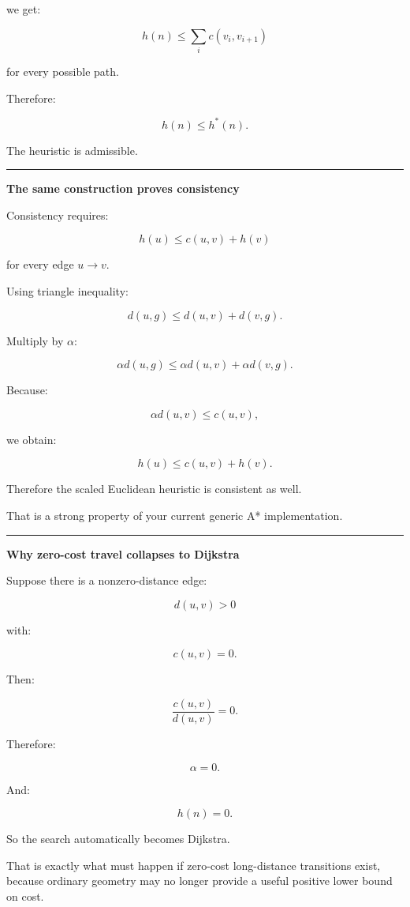 we get:

\[
\boxed{
h(n)
\le
\sum_i c(v_i,v_{i+1})
}
\]

for every possible path.

Therefore:

\[
h(n)\le h^*(n).
\]

The heuristic is admissible.

\begin{center}\rule{0.5\linewidth}{0.5pt}\end{center}

\textbf{The same construction proves consistency}

Consistency requires:

\[
\boxed{
h(u)\le c(u,v)+h(v)
}
\]

for every edge \(u\rightarrow v\).

Using triangle inequality:

\[
d(u,g)
\le
d(u,v)+d(v,g).
\]

Multiply by \(\alpha\):

\[
\alpha d(u,g)
\le
\alpha d(u,v)
+
\alpha d(v,g).
\]

Because:

\[
\alpha d(u,v)
\le
c(u,v),
\]

we obtain:

\[
h(u)
\le
c(u,v)+h(v).
\]

Therefore the scaled Euclidean heuristic is consistent as well.

That is a strong property of your current generic A* implementation.

\begin{center}\rule{0.5\linewidth}{0.5pt}\end{center}

\textbf{Why zero-cost travel collapses to Dijkstra}

Suppose there is a nonzero-distance edge:

\[
d(u,v)>0
\]

with:

\[
c(u,v)=0.
\]

Then:

\[
\frac{c(u,v)}{d(u,v)}
=
0.
\]

Therefore:

\[
\alpha=0.
\]

And:

\[
h(n)=0.
\]

So the search automatically becomes Dijkstra.

That is exactly what must happen if zero-cost long-distance transitions exist, because ordinary geometry may no longer provide a useful positive lower bound on cost.

